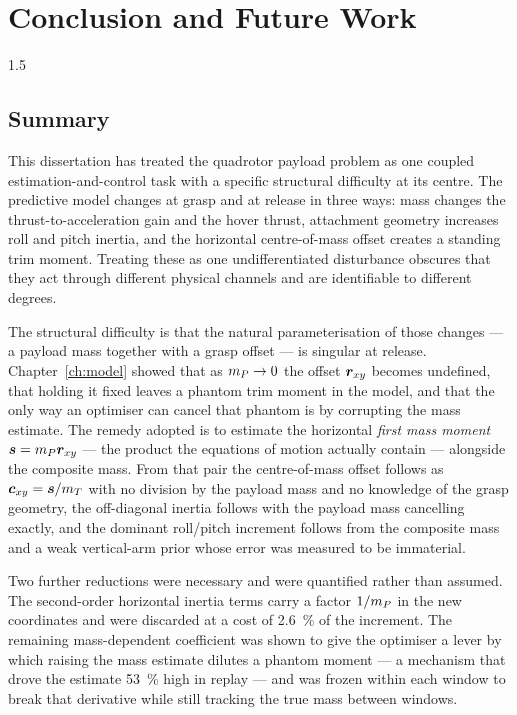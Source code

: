 
\chapter{Conclusion and Future Work}
\label{ch:conclusion}
\begin{spacing}{1.5}
\setlength{\parskip}{0.22in}

\section{Summary}

This dissertation has treated the quadrotor payload problem as one coupled
estimation-and-control task with a specific structural difficulty at its centre.
The predictive model changes at grasp and at release in three ways: mass changes
the thrust-to-acceleration gain and the hover thrust, attachment geometry
increases roll and pitch inertia, and the horizontal centre-of-mass offset
creates a standing trim moment. Treating these as one undifferentiated
disturbance obscures that they act through different physical channels and are
identifiable to different degrees.

The structural difficulty is that the natural parameterisation of those changes
--- a payload mass together with a grasp offset --- is singular at release.
Chapter~\ref{ch:model} showed that as $m_P\to0$ the offset $\bm{r}_{xy}{}$ becomes
undefined, that holding it fixed leaves a phantom trim moment in the model, and
that the only way an optimiser can cancel that phantom is by corrupting the mass
estimate. The remedy adopted is to estimate the horizontal \emph{first mass
moment} $\bm{s}=m_P\bm{r}_{xy}{}$ --- the product the equations of motion actually
contain --- alongside the composite mass. From that pair the centre-of-mass
offset follows as $\bm{c}_{xy}=\bm{s}/m_T$ with no division by the payload mass and no
knowledge of the grasp geometry, the off-diagonal inertia follows with the
payload mass cancelling exactly, and the dominant roll/pitch increment follows
from the composite mass and a weak vertical-arm prior whose error was measured to
be immaterial.

Two further reductions were necessary and were quantified rather than assumed.
The second-order horizontal inertia terms carry a factor $1/m_P$ in the new
coordinates and were discarded at a cost of \SI{2.6}{\percent} of the increment.
The remaining mass-dependent coefficient was shown to give the optimiser a lever
by which raising the mass estimate dilutes a phantom moment --- a mechanism that
drove the estimate \SI{53}{\percent} high in replay --- and was frozen within each
window to break that derivative while still tracking the true mass between
windows.


\end{spacing}
